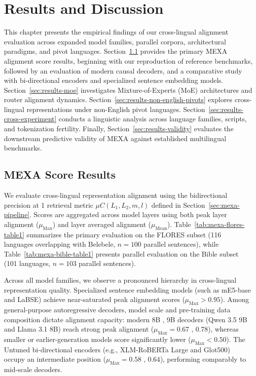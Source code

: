 \chapter{Results and Discussion}
\label{ch:results}

This chapter presents the empirical findings of our cross-lingual alignment evaluation across expanded model families, parallel corpora, architectural paradigms, and pivot languages. Section~\ref{sec:results-mexa} provides the primary MEXA alignment score results, beginning with our reproduction of reference benchmarks, followed by an evaluation of modern causal decoders, and a comparative study with bi-directional encoders and specialized sentence embedding models. Section~\ref{sec:results-moe} investigates Mixture-of-Experts (MoE) architectures and router alignment dynamics. Section~\ref{sec:results-non-english-pivots} explores cross-lingual representations under non-English pivot languages. Section~\ref{sec:results-cross-experiment} conducts a linguistic analysis across language families, scripts, and tokenization fertility. Finally, Section~\ref{sec:results-validity} evaluates the downstream predictive validity of MEXA against established multilingual benchmarks.

\section{MEXA Score Results}
\label{sec:results-mexa}

We evaluate cross-lingual representation alignment using the bidirectional precision at 1 retrieval metric $\mu C(L_1, L_2, m, l)$ defined in Section~\ref{sec:mexa-pipeline}. Scores are aggregated across model layers using both peak layer alignment ($\mu_{\text{Max}}$) and layer averaged alignment ($\mu_{\text{Mean}}$). Table~\ref{tab:mexa-flores-table1} summarizes the primary evaluation on the FLORES subset (116 languages overlapping with Belebele, $n = 100$ parallel sentences), while Table~\ref{tab:mexa-bible-table1} presents parallel evaluation on the Bible subset (101 languages, $n = 103$ parallel sentences).

Across all model families, we observe a pronounced hierarchy in cross-lingual representation quality. Specialized sentence embedding models (such as mE5-base and LaBSE) achieve near-saturated peak alignment scores ($\mu_{\text{Max}} > 0.95$). Among general-purpose autoregressive decoders, model scale and pre-training data composition dictate alignment capacity: modern 8B , 9B decoders (Qwen 3.5 9B and Llama 3.1 8B) reach strong peak alignment ($\mu_{\text{Max}} = 0.67$ , $0.78$), whereas smaller or earlier-generation models score significantly lower ($\mu_{\text{Max}} < 0.50$). The Untuned bi-directional encoders (e.g., XLM-RoBERTa Large and Glot500) occupy an intermediate position ($\mu_{\text{Max}} = 0.58$ , $0.64$), performing comparably to mid-scale decoders.

